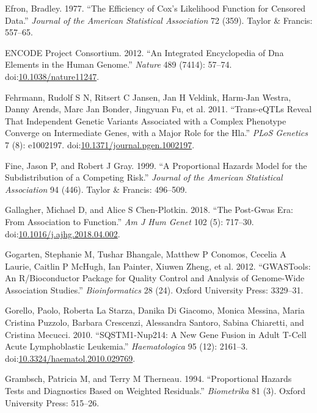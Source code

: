 \documentclass[]{DissertateOSU}
\begin{document}
\hypertarget{ref-efron1977}{}
Efron, Bradley. 1977. ``The Efficiency of Cox's Likelihood Function for
Censored Data.'' \emph{Journal of the American Statistical Association}
72 (359). Taylor \& Francis: 557--65.

\hypertarget{ref-encode_2012}{}
ENCODE Project Consortium. 2012. ``An Integrated Encyclopedia of Dna
Elements in the Human Genome.'' \emph{Nature} 489 (7414): 57--74.
doi:\href{https://doi.org/10.1038/nature11247}{10.1038/nature11247}.

\hypertarget{ref-Fehrmann_2011}{}
Fehrmann, Rudolf S N, Ritsert C Jansen, Jan H Veldink, Harm-Jan Westra,
Danny Arends, Marc Jan Bonder, Jingyuan Fu, et al. 2011. ``Trans-eQTLs
Reveal That Independent Genetic Variants Associated with a Complex
Phenotype Converge on Intermediate Genes, with a Major Role for the
Hla.'' \emph{PLoS Genetics} 7 (8): e1002197.
doi:\href{https://doi.org/10.1371/journal.pgen.1002197}{10.1371/journal.pgen.1002197}.

\hypertarget{ref-fine1999}{}
Fine, Jason P, and Robert J Gray. 1999. ``A Proportional Hazards Model
for the Subdistribution of a Competing Risk.'' \emph{Journal of the
American Statistical Association} 94 (446). Taylor \& Francis: 496--509.

\hypertarget{ref-gallagher_2018}{}
Gallagher, Michael D, and Alice S Chen-Plotkin. 2018. ``The Post-Gwas
Era: From Association to Function.'' \emph{Am J Hum Genet} 102 (5):
717--30.
doi:\href{https://doi.org/10.1016/j.ajhg.2018.04.002}{10.1016/j.ajhg.2018.04.002}.

\hypertarget{ref-gwastools}{}
Gogarten, Stephanie M, Tushar Bhangale, Matthew P Conomos, Cecelia A
Laurie, Caitlin P McHugh, Ian Painter, Xiuwen Zheng, et al. 2012.
``GWASTools: An R/Bioconductor Package for Quality Control and Analysis
of Genome-Wide Association Studies.'' \emph{Bioinformatics} 28 (24).
Oxford University Press: 3329--31.

\hypertarget{ref-gorello_2010}{}
Gorello, Paolo, Roberta La Starza, Danika Di Giacomo, Monica Messina,
Maria Cristina Puzzolo, Barbara Crescenzi, Alessandra Santoro, Sabina
Chiaretti, and Cristina Mecucci. 2010. ``SQSTM1-Nup214: A New Gene
Fusion in Adult T-Cell Acute Lymphoblastic Leukemia.''
\emph{Haematologica} 95 (12): 2161--3.
doi:\href{https://doi.org/10.3324/haematol.2010.029769}{10.3324/haematol.2010.029769}.

\hypertarget{ref-grambsch_ph}{}
Grambsch, Patricia M, and Terry M Therneau. 1994. ``Proportional Hazards
Tests and Diagnostics Based on Weighted Residuals.'' \emph{Biometrika}
81 (3). Oxford University Press: 515--26.
\end{document}

